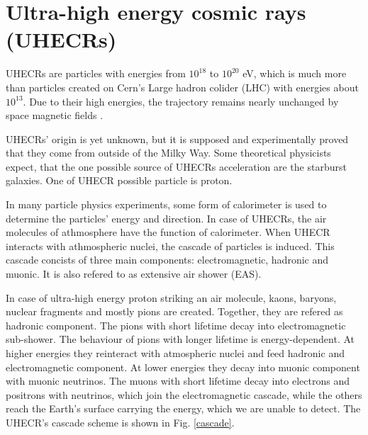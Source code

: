 \section{Ultra-high energy cosmic rays (UHECRs)}
UHECRs are particles with energies from $10^{18}$ to $10^{20}$ eV, which is much more than particles created on Cern's Large hadron colider (LHC) with energies about $10^{13}$. Due to their high energies, the trajectory remains nearly unchanged by space magnetic fields \cite{Benjamin_Skuse}.
\par
UHECRs' origin is yet unknown, but it is supposed and experimentally proved that they come from outside of the Milky Way. Some theoretical physicists expect, that the one possible source of UHECRs acceleration are the starburst galaxies. One of UHECR possible particle is proton. 
\par
In many particle physics experiments, some form of calorimeter is used to determine the particles' energy and direction. In case of UHECRs, the air molecules of athmosphere have the function of calorimeter.
When UHECR interacts with athmospheric nuclei, the cascade of particles is induced. This cascade concists of three main components: electromagnetic, hadronic and muonic. It is also refered to as extensive air shower (EAS).
\par
In case of ultra-high energy proton striking an air molecule, kaons, baryons, nuclear fragments and mostly pions are created. Together, they are refered as hadronic component. The pions with short lifetime decay into electromagnetic sub-shower. The behaviour of pions with longer lifetime is energy-dependent. At higher energies they reinteract with atmospheric nuclei and feed hadronic and electromagnetic component. At lower energies they decay into muonic component with muonic neutrinos. The muons with short lifetime decay into electrons and positrons with neutrinos, which join the electromagnetic cascade, while the others reach the Earth's surface carrying the energy, which we are unable to detect. The UHECR's cascade scheme is shown in Fig. \ref{cascade}. 
